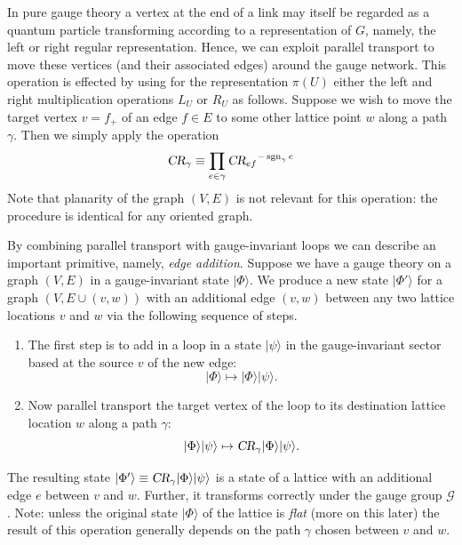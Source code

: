 \documentclass[twocolumn,lengthcheck,superscriptaddress]{revtex4-1}
\newcommand{\sgn}{\operatorname{sgn}}
\def\CR{\textsl{CR}}
\theoremstyle{definition}
\theoremstyle{remark}
\begin{document}
In pure gauge theory a vertex at the end of a link may itself be regarded as a quantum particle transforming according to a representation of $G$, namely, the left or right regular representation. Hence, we can exploit parallel transport to move these vertices (and their associated edges) around the gauge network. This operation is effected by using for the representation $\pi(U)$ either the left and right multiplication operations $L_U$ or $R_U$ as follows. Suppose we wish to move the target vertex $v = f_+$ of an edge $f \in E$ to some other lattice point $w$ along a path $\gamma$. Then we simply apply the operation
\begin{equation}
	\CR_\gamma \equiv \prod_{e\in \gamma} {\CR_{e f}}^{-\sgn_\gamma{e}}
\end{equation}
Note that planarity of the graph $(V,E)$ is not relevant for this operation: the procedure is identical for any oriented graph.

By combining parallel transport with gauge-invariant loops we can describe an important primitive, namely, \emph{edge addition}. Suppose we have a gauge theory on a graph $(V,E)$ in a gauge-invariant state $|\Phi\rangle$. We produce a new state $|\Phi'\rangle$ for a graph $(V, E\cup (v,w))$ with an additional edge $(v,w)$  between any two lattice locations $v$ and $w$ via the following sequence of steps. \begin{enumerate}
	\item The first step is to add in a loop in a state $|\psi\rangle$ in the gauge-invariant sector based at the source $v$ of the new edge:
	\begin{equation}
		|\Phi\rangle \mapsto |\Phi\rangle |\psi\rangle.
	\end{equation}
	\item Now parallel transport the target vertex of the loop to its destination lattice location $w$ along a path $\gamma$:
	\begin{equation}
		|\Phi\rangle |\psi\rangle \mapsto \CR_\gamma |\Phi\rangle |\psi\rangle.
	\end{equation}
\end{enumerate}
The resulting state $|\Phi'\rangle \equiv \CR_\gamma |\Phi\rangle |\psi\rangle$ is a state of a lattice with an additional edge $e$ between $v$ and $w$. Further, it transforms correctly under the gauge group $\mathcal{G}$. Note: unless the original state $|\Phi\rangle$ of the lattice is \emph{flat} (more on this later) the result of this operation generally depends on the path $\gamma$ chosen between $v$ and $w$. 
\end{document}
